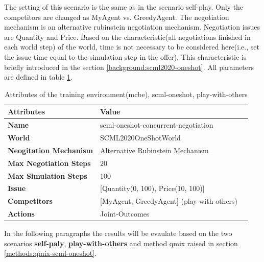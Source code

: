 The setting of this scenario is the same as in the scenario self-play. Only the competitors are changed as MyAgent vs. GreedyAgent. The negotiation mechanism is an alternative rubinstein negotiation mechanism. Negotiation issues are Quantity and Price. Based on the characteristic(all negotiations finished in each world step) of the world, time is not necessary to be considered here(i.e., set the issue time equal to the simulation step in the offer). This characteristic is briefly introduced in the section \ref{background:scml2020-oneshot}. 
All parameters are defined in table \ref{tab:attributes-mcbe-concurrent-negotiation-scml-oneshot-with-others}.

\begin{table}[htbp]
\centering
\begin{tabular}{l l l} \toprule
\bfseries \textbf{Attributes}    & \bfseries \textbf{Value}                                             \\ \midrule
\textbf{Name}                    & scml-oneshot-concurrent-negotiation                                  \\
\textbf{World}                   & SCML2020OneShotWorld                                                 \\
\textbf{Neogitation Mechanism}   & Alternative Rubinstein Mechanism                                                         \\
\textbf{Max Negotiation Steps}   & 20                                                                  \\
\textbf{Max Simulation Steps}    & 100                                                                   \\
\textbf{Issue}             	     & [Quantity(0, 100), Price(10, 100)]                     \\
\textbf{Competitors}             & [MyAgent, GreedyAgent] (play-with-others)                                       \\
\textbf{Actions}                 & Joint-Outcomes                                                             \\
\bottomrule
\end{tabular}
\caption{Attributes of the training environment(mcbe), scml-oneshot, play-with-others}
\label{tab:attributes-mcbe-concurrent-negotiation-scml-oneshot-with-others}
\end{table}

In the following paragraphs the results will be evaulate based on the two scenarios \textbf{self-paly},\textbf{ play-with-others} and method qmix raised in section \ref{methods:qmix-scml-oneshot}.

